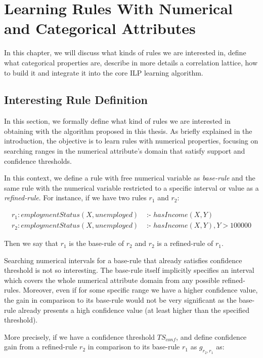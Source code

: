 \chapter{Learning Rules With Numerical and Categorical Attributes}
\label{cl:intro}

In this chapter, we will discuss what kinds of rules we are interested in, define what categorical properties are,
describe in more details a correlation lattice, how to build it and integrate it into the core ILP learning
algorithm.

\section{Interesting Rule Definition}

In this section, we formally define what kind of rules we are interested in obtaining with the algorithm proposed in
this thesis. As briefly explained in the introduction, the objective is to learn rules with numerical properties,
focusing on searching ranges in the numerical attribute's domain that satisfy support and confidence thresholds.

In this context, we define a rule with free numerical variable as \emph{base-rule} and the same rule with the
numerical variable restricted to a specific interval or value as a \emph{refined-rule}. For instance, if we have
two rules $r_1$ and $r_2$:

\begin{align*}
r_1: employmentStatus(X,unemployed)&\text{ :- }hasIncome(X,Y) \\
r_2: employmentStatus(X,unemployed)&\text{ :- }hasIncome(X,Y),Y>100000
\end{align*}

Then we say that $r_1$ is the base-rule of $r_2$ and $r_2$ is a refined-rule of $r_1$.

Searching numerical intervals for a base-rule that already satisfies confidence threshold is not so interesting. The
base-rule itself implicitly specifies an interval which covers the whole numerical attribute domain from any possible
refined-rules. Moreover, even if for some specific range we have a higher confidence value, the gain in comparison to
its base-rule would not be very significant as the base-rule already presents a high confidence value (at least higher
than the specified threshold).

More precisely, if we have a confidence threshold $TS_{conf}$, and define confidence gain from a refined-rule
$r_2$ in comparison to its base-rule $r_1$ as $g_{r_2,r_1}$ as:


